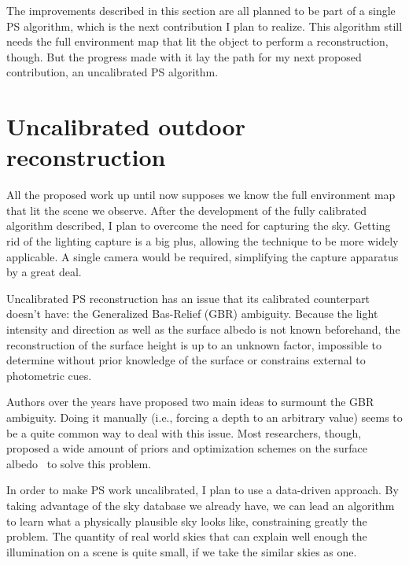 The improvements described in this section are all planned to be part of a single PS algorithm, which is the next contribution I plan to realize. This algorithm still needs the full environment map that lit the object to perform a reconstruction, though. But the progress made with it lay the path for my next proposed contribution, an uncalibrated PS algorithm.

\section{Uncalibrated outdoor reconstruction}
\label{sec:uncalib}

All the proposed work up until now supposes we know the full environment map that lit the scene we observe. After the development of the fully calibrated algorithm described, I plan to overcome the need for capturing the sky. Getting rid of the lighting capture is a big plus, allowing the technique to be more widely applicable. A single camera would be required, simplifying the capture apparatus by a great deal.

Uncalibrated PS reconstruction has an issue that its calibrated counterpart doesn't have: the Generalized Bas-Relief (GBR) ambiguity. Because the light intensity and direction as well as the surface albedo is not known beforehand, the reconstruction of the surface height is up to an unknown factor, impossible to determine without prior knowledge of the surface or constrains external to photometric cues.

Authors over the years have proposed two main ideas to surmount the GBR ambiguity. Doing it manually (i.e., forcing a depth to an arbitrary value) seems to be a quite common way to deal with this issue. Most researchers, though, proposed a wide amount of priors and optimization schemes on the surface albedo~\cite{tan-cvpr-07,alldrin-cvpr-08,abrams-eccv-12,queau-jmiv-14} to solve this problem.

In order to make PS work uncalibrated, I plan to use a data-driven approach. By taking advantage of the sky database we already have, we can lead an algorithm to learn what a physically plausible sky looks like, constraining greatly the problem. The quantity of real world skies that can explain well enough the illumination on a scene is quite small, if we take the similar skies as one.

